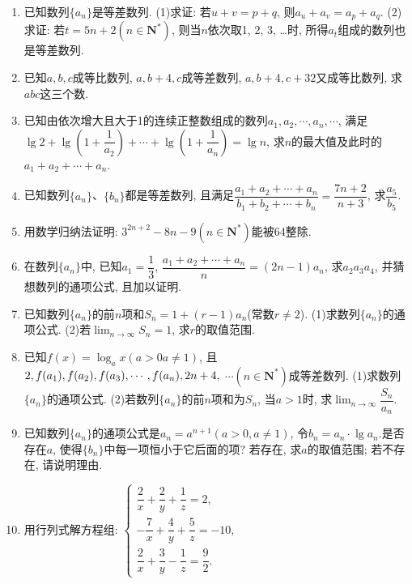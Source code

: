 \documentclass[10pt,a4paper]{article}
\newcommand{\blank}[1]{\underline{\hbox to #1pt{}}}
\newcommand{\bracket}[1]{(\hbox to #1pt{})}
\newcommand{\fourch}[4]{\par\begin{tabular}{p{.23\textwidth}p{.23\textwidth}p{.23\textwidth}p{.23\textwidth}}
A.~#1 &B.~#2& C.~#3& D.~#4
\end{tabular}}
\begin{document}
\begin{enumerate}[1.]
(3)设一直线上三点$ABP$满足$\overrightarrow {AP}=\lambda \overrightarrow {PB}(\lambda \ne \pm 1)$, $O$是平面内一点, $\overrightarrow {OP}$可用$\overrightarrow {OA}$、$\overrightarrow {OB}$表示为\blank{50}\bracket{20}.
\fourch{$\overrightarrow {OP}=\overrightarrow {OA}+\lambda \overrightarrow {OB}$;}{$\overrightarrow {OP}=\lambda \overrightarrow {OA}+(1-\lambda)\overrightarrow {OB}$;}{$\overrightarrow {OP}=\dfrac{\overrightarrow {OA}+\lambda \overrightarrow {OB}}{1+\lambda }$;}{$\overrightarrow {OP}=\dfrac 1{\lambda }\overrightarrow {OA}+\dfrac 1{1-\lambda }\overrightarrow {OB}$}
\item 已知数列$\{a_n\}$是等差数列.
(1)求证: 若$u+v=p+q$, 则$a_u+a_v=a_p+a_q$.
(2)求证: 若$t=5n+2(n\in \mathbf{N}^*)$, 则当$n$依次取1, 2, 3, …时, 所得$a_t$组成的数列也是等差数列.
\item 已知$a,b,c$成等比数列, $a,b+4,c$成等差数列, $a,b+4,c+32$又成等比数列, 求$abc$这三个数.
\item 已知由依次增大且大于1的连续正整数组成的数列$a_1,a_2,\cdots ,a_n,\cdots$, 满足$\lg 2+\lg (1+\dfrac 1{a_2})+\cdots +\lg (1+\dfrac 1{a_n})=\lg n$, 求$n$的最大值及此时的$a_1+a_2+\cdots +a_n$.
\item 已知数列$\{a_n\}$、$\{b_n\}$都是等差数列, 且满足$\dfrac{{a_1}+{a_2}+\cdots +{a_n}}{{b_1}+{b_2}+\cdots +{b_n}}=\dfrac{7n+2}{n+3}$, 求$\dfrac{a_5}{b_5}$.
\item 用数学归纳法证明: $3^{2n+2}-8n-9(n\in \mathbf{N}^*)$能被64整除.
\item 在数列$\{a_n\}$中, 已知$a_1=\dfrac 13$, $\dfrac{a_1+a_2+\cdots +a_n}n=(2n-1)a_n$, 求$a_2a_3a_4$, 并猜想数列的通项公式, 且加以证明.
\item 已知数列$\{a_n\}$的前$n$项和$S_n=1+(r-1)a_n$(常数$r\ne 2$).
(1)求数列$\{a_n\}$的通项公式.
(2)若$\displaystyle\lim_{n\to\infty}S_n=1$, 求$r$的取值范围.
\item 已知$f(x)=\log _ax(a>0a\ne 1)$, 且$\text2,f(a_1),f(a_2),f(a_3),\cdots ,f(a_n),2n+4,$ $\cdots (n\in \mathbf{N}^*)$成等差数列.
(1)求数列$\{a_n\}$的通项公式.
(2)若数列$\{a_n\}$的前$n$项和为$S_n$, 当$a>1$时, 求$\displaystyle\lim_{n\to\infty}\dfrac{S_n}{a_n}$.
\item 已知数列$\{a_n\}$的通项公式是$a_n=a^{n+1}(a>0,a\ne 1)$, 令$b_n=a_n\cdot \lg a_n$.是否存在$a$, 使得$\{b_n\}$中每一项恒小于它后面的项? 若存在, 求$a$的取值范围; 若不存在, 请说明理由.
\item 用行列式解方程组: $\begin{cases}
    \dfrac 2x+\dfrac 2y+\dfrac 1z=2,  \\-\dfrac 7x+\dfrac 4y+\dfrac 5z=-10,  \\\dfrac 2x+\dfrac 3y-\dfrac 1z=\dfrac 92.  \end{cases}$

\end{enumerate}
\end{document}
